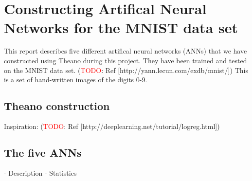 
\section{Constructing Artifical Neural Networks for the MNIST data set}
This report describes five different artifical neural networks (ANNs)
that we have constructed using Theano during this project. They have
been trained and tested on the MNIST data set.
(\textcolor{red}{TODO}: Ref [http://yann.lecun.com/exdb/mnist/])
This is a set of
hand-written images of the digits 0-9.

\subsection{Theano construction}

Inspiration: (\textcolor{red}{TODO}: Ref [http://deeplearning.net/tutorial/logreg.html])

\subsection{The five ANNs}


- Description
- Statistics

